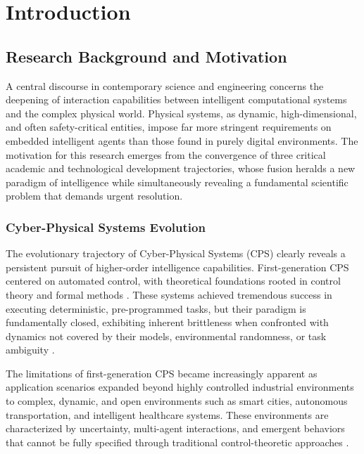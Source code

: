 
\chapter{Introduction} \label{chp:intro}

\section{Research Background and Motivation}

A central discourse in contemporary science and engineering concerns the deepening of interaction capabilities between intelligent computational systems and the complex physical world. Physical systems, as dynamic, high-dimensional, and often safety-critical entities, impose far more stringent requirements on embedded intelligent agents than those found in purely digital environments. The motivation for this research emerges from the convergence of three critical academic and technological development trajectories, whose fusion heralds a new paradigm of intelligence while simultaneously revealing a fundamental scientific problem that demands urgent resolution.

\subsection{Cyber-Physical Systems Evolution}

The evolutionary trajectory of Cyber-Physical Systems (CPS) clearly reveals a persistent pursuit of higher-order intelligence capabilities. First-generation CPS centered on automated control, with theoretical foundations rooted in control theory and formal methods \cite{lee2008cyber, rajkumar2010cyber}. These systems achieved tremendous success in executing deterministic, pre-programmed tasks, but their paradigm is fundamentally closed, exhibiting inherent brittleness when confronted with dynamics not covered by their models, environmental randomness, or task ambiguity \cite{baheti2011cyber, kim2012cyber}.

The limitations of first-generation CPS became increasingly apparent as application scenarios expanded beyond highly controlled industrial environments to complex, dynamic, and open environments such as smart cities, autonomous transportation, and intelligent healthcare systems. These environments are characterized by uncertainty, multi-agent interactions, and emergent behaviors that cannot be fully specified through traditional control-theoretic approaches \cite{doyle1989robust, zhou1996robust}.

